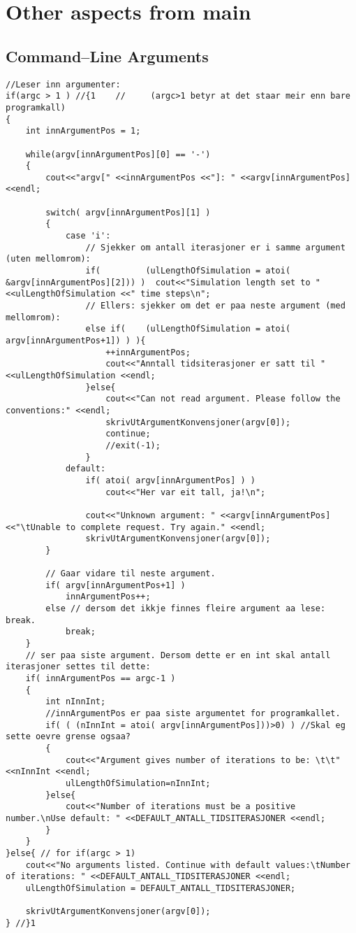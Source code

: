 \chapter{Other aspects from main} %

\section{Command--Line Arguments}
\label{appendixCommandLineArguments}
\begin{lstlisting}
//Leser inn argumenter: 
if(argc > 1 ) //{1 	  //	 (argc>1 betyr at det staar meir enn bare programkall)
{
	int innArgumentPos = 1;

	while(argv[innArgumentPos][0] == '-')
	{
		cout<<"argv[" <<innArgumentPos <<"]: " <<argv[innArgumentPos] <<endl;

		switch( argv[innArgumentPos][1] )
		{
			case 'i':
				// Sjekker om antall iterasjoner er i samme argument (uten mellomrom):
				if( 		(ulLengthOfSimulation = atoi( &argv[innArgumentPos][2])) ) 	cout<<"Simulation length set to " <<ulLengthOfSimulation <<" time steps\n";
				// Ellers: sjekker om det er paa neste argument (med mellomrom):
				else if( 	(ulLengthOfSimulation = atoi( argv[innArgumentPos+1]) ) ){
					++innArgumentPos;
					cout<<"Anntall tidsiterasjoner er satt til " <<ulLengthOfSimulation <<endl;
				}else{
					cout<<"Can not read argument. Please follow the conventions:" <<endl;
					skrivUtArgumentKonvensjoner(argv[0]);
					continue;
					//exit(-1);
				}
			default:
				if( atoi( argv[innArgumentPos] ) )
					cout<<"Her var eit tall, ja!\n";

				cout<<"Unknown argument: " <<argv[innArgumentPos] <<"\tUnable to complete request. Try again." <<endl;
				skrivUtArgumentKonvensjoner(argv[0]);
		}

		// Gaar vidare til neste argument.
		if( argv[innArgumentPos+1] ) 
			innArgumentPos++;
		else // dersom det ikkje finnes fleire argument aa lese: break.
			break;
	}
	// ser paa siste argument. Dersom dette er en int skal antall iterasjoner settes til dette:
	if( innArgumentPos == argc-1 )
	{
		int nInnInt;
		//innArgumentPos er paa siste argumentet for programkallet.
		if( ( (nInnInt = atoi( argv[innArgumentPos]))>0) ) //Skal eg sette oevre grense ogsaa?
		{
			cout<<"Argument gives number of iterations to be: \t\t" <<nInnInt <<endl;
			ulLengthOfSimulation=nInnInt;
		}else{
			cout<<"Number of iterations must be a positive number.\nUse default: " <<DEFAULT_ANTALL_TIDSITERASJONER <<endl;
		}
	}
}else{ // for if(argc > 1)
	cout<<"No arguments listed. Continue with default values:\tNumber of iterations: " <<DEFAULT_ANTALL_TIDSITERASJONER <<endl;
	ulLengthOfSimulation = DEFAULT_ANTALL_TIDSITERASJONER;

	skrivUtArgumentKonvensjoner(argv[0]);
} //}1
\end{lstlisting}
